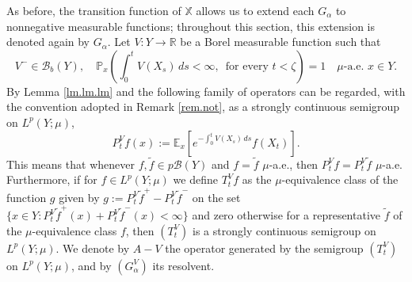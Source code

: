 \documentclass[11pt,a4paper,reqno]{amsart}
\theoremstyle{definition}
\numberwithin{equation}{section}
\begin{document}
As before, the transition function of $\mathbb X$ allows us to extend each $G_\alpha$ to nonnegative measurable 
functions; throughout this section, this extension is denoted again by $G_\alpha$.
Let  $V:Y\to \mathbb R$ be a   Borel measurable function such that 
\begin{equation}
\label{eq.c1}
V^-\in \mathcal B_b(Y),\quad \mathbb P_x\left(\int_0^t V(X_s)\,ds<\infty,\,\text{ for every } t<\zeta\right)
=1\quad \mu\text{-a.e. }x\in Y.
\end{equation}
By Lemma \ref{lm.lm.lm} and \cite[Theorem 3.14, Lemma 3.15]{Getoor} the following family  of operators can be regarded, 
with the convention adopted in Remark \ref{rem.not}, as a strongly continuous semigroup on $L^p(Y;\mu)$,
\begin{equation}
\label{eq.fkf1}
P^V_tf(x):=\mathbb E_x\left[e^{-\int_0^t V(X_s)\,ds}f(X_t)\right].
\end{equation}
This means  that whenever $f,\tilde f\in p\mathcal B(Y)$ and $f=\tilde f$ $\mu$-a.e., then $P^V_tf=P^V_t\tilde f$ $\mu$-a.e.
Furthermore,   if for $f\in L^p(Y;\mu)$  we define $T^V_tf$ as the $\mu$-equivalence class of the function $g$ 
given by   $g:=P^V_t \tilde f^+-P^V_t \tilde f^-$ on the set $\{x\in Y: P^V_t \tilde f^+(x)+P^V_t \tilde f^-(x)<\infty\}$
and zero otherwise for a  representative $\tilde f$ of the  $\mu$-equivalence class  $f$, then $(T^V_t)$ 
is a   strongly continuous  semigroup  on $L^p(Y;\mu)$.
We  denote by $A-V$ the operator generated by the semigroup  $(T^V_t)$   on  $L^p(Y;\mu)$, and by $(G^V_\alpha)$ its resolvent. 
\end{document}
